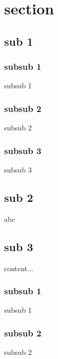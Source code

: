 \documentclass{beamer}
\newcounter{totalsubsub}
\begin{document}
\section{section}
\subsection{sub 1}
\setcounter{totalsubsub}{3}

\subsubsection{subsub 1}
\begin{frame}
    subsub 1
\end{frame} 

\subsubsection{subsub 2}
\begin{frame}
    subsub 2
\end{frame} 

\subsubsection{subsub 3}
\begin{frame}
    subsub 3
\end{frame} 

\subsection{sub 2}
\setcounter{totalsubsub}{0}

\begin{frame}
    abc
\end{frame} 

\subsection{sub 3}
\setcounter{totalsubsub}{2}

\begin{frame}
content...
\end{frame}

\subsubsection{subsub 1}
\begin{frame}
    subsub 1
\end{frame} 

\subsubsection{subsub 2}
\begin{frame}
    subsub 2
\end{frame} 
\end{document}
